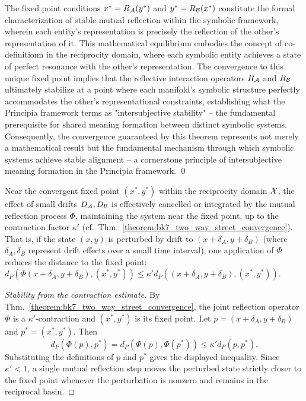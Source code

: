 \begin{demonstratio}
The fixed point conditions \(x^{\ast} = R_{\mathcal{A}}(y^{\ast})\) and \(y^{\ast} = R_{\mathcal{B}}(x^{\ast})\) constitute the formal characterization of stable mutual reflection within the symbolic framework, wherein each entity's representation is precisely the reflection of the other's representation of it. This mathematical equilibrium embodies the concept of co-definitionn in the reciprocity domain, where each symbolic entity achieves a state of perfect resonance with the other's representation. The convergence to this unique fixed point implies that the reflective interaction operators \(R_{\mathcal{A}}\) and \(R_{\mathcal{B}}\) ultimately stabilize at a point where each manifold's symbolic structure perfectly accommodates the other's representational constraints, establishing what the Principia framework terms as "intersubjective stability" -- the fundamental prerequisite for shared meaning formation between distinct symbolic systems. Consequently, the convergence guaranteed by this theorem represents not merely a mathematical result but the fundamental mechanism through which symbolic systems achieve stable alignment -- a cornerstone principle of intersubjective meaning formation in the Principia framework. \qed \end{demonstratio}
\begin{corollary}
\label{corollary:bk7_stability_near_reciprocity}
Near the convergent fixed point \((x^{\ast}, y^{\ast})\) within the reciprocity domain \(\mathcal{X}\), the effect of small drifts \(D_{\mathcal{A}}, D_{\mathcal{B}}\) is effectively cancelled or integrated by the mutual reflection process \(\Phi\), maintaining the system near the fixed point, up to the contraction factor \(\kappa'\) (cf.~Thm.~\ref{theorem:bk7_two_way_street_convergence}). That is, if the state \((x,y)\) is perturbed by drift to \((x+\delta_A, y+\delta_B)\) (where \(\delta_A, \delta_B\) represent drift effects over a small time interval), one application of \(\Phi\) reduces the distance to the fixed point: \(d_P(\Phi(x+\delta_A, y+\delta_B), (x^{\ast}, y^{\ast})) \le \kappa' d_P((x+\delta_A, y+\delta_B), (x^{\ast}, y^{\ast}))\).
\end{corollary}
\begin{proof}[Stability from the contraction estimate]
\label{proof:bk7_stability_near_reciprocity}
\leavevmode
By Thm.~\ref{theorem:bk7_two_way_street_convergence}, the joint reflection operator \(\Phi\) is a \(\kappa'\)-contraction and \((x^*,y^*)\) is its fixed point. Let \(p=(x+\delta_A,y+\delta_B)\) and \(p^*=(x^*,y^*)\). Then
\[
d_P(\Phi(p),p^*)=d_P(\Phi(p),\Phi(p^*))
\leq \kappa' d_P(p,p^*).
\]
Substituting the definitions of \(p\) and \(p^*\) gives the displayed inequality. Since \(\kappa'<1\), a single mutual reflection step moves the perturbed state strictly closer to the fixed point whenever the perturbation is nonzero and remains in the reciprocal basin.
\end{proof}
